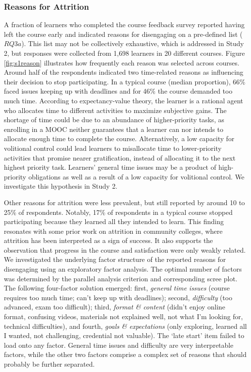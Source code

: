 \documentclass{sigchi}\usepackage[]{graphicx}\usepackage[]{color}
\begin{document}
\subsubsection{Reasons for Attrition}

A fraction of learners who completed the course feedback survey reported having left the course early and indicated reasons for disengaging on a pre-defined list ($RQ3a$). This list may not be collectively exhaustive, which is addressed in Study 2, but responses were collected from 1,698 learners in 20 different courses. Figure \ref{fig:s1reason} illustrates how frequently each reason was selected across courses. Around half of the respondents indicated two time-related reasons as influencing their decision to stop participating. In a typical course (median proportion), 66\% faced issues keeping up with deadlines and for 46\% the course demanded too much time. According to expectancy-value theory, the learner is a rational agent who allocates time to different activities to maximize subjective gains. The shortage of time could be due to an abundance of higher-priority tasks, as enrolling in a MOOC neither guarantees that a learner can nor intends to allocate enough time to complete the course. Alternatively, a low capacity for volitional control \cite{corno2001volitional} could lead learners to misallocate time to lower-priority activities that promise nearer gratification, instead of allocating it to the next highest priority task. Learners' general time issues may be a product of high-priority obligations as well as a result of a low capacity for volitional control. We investigate this hypothesis in Study 2.

Other reasons for attrition were less prevalent, but still reported by around 10 to 25\% of respondents. Notably, 17\% of respondents in a typical course stopped participating because they learned all they intended to learn. This finding resonates with some prior work on attrition in community colleges, where attrition has been interpreted as a sign of success. It also supports the observation that progress in the course and satisfaction were only weakly related. We investigated the underlying factor structure of the reported reasons for disengaging using an exploratory factor analysis. The optimal number of factors was determined by the parallel analysis criterion and corresponding scree plot. The following four-factor solution emerged: first, {\em general time issues} (course requires too much time; can't keep up with deadlines);  second, {\em difficulty} (too advanced, exam too difficult); third, {\em format \& content} (didn't enjoy online format, confusing videos, materials not explained well, not what I'm looking for, technical difficulties), and fourth, {\em goals \& expectations} (only exploring, learned all I wanted, not challenging, credential not valuable). The `late start' item failed to load onto any factor. General time issues and difficulty are very interpretable factors, while the other two factors comprise a complex set of reasons that should probably be further separated.
\end{document}
